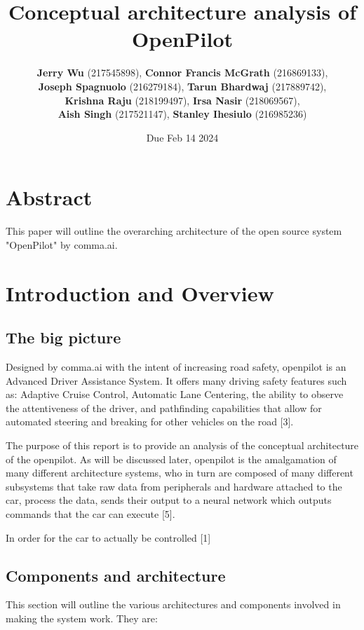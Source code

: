 \documentclass[12pt]{article}
\title{Conceptual architecture analysis of OpenPilot}
\author{
    \textbf{Jerry Wu} (217545898), \textbf{Connor Francis McGrath} (216869133),\\
    \textbf{Joseph Spagnuolo} (216279184), \textbf{Tarun Bhardwaj} (217889742),\\
    \textbf{Krishna Raju} (218199497), \textbf{Irsa Nasir} (218069567),\\
    \textbf{Aish Singh} (217521147), \textbf{Stanley Ihesiulo} (216985236)
}
\date{Due Feb 14 2024}
\begin{document}
\maketitle
\tableofcontents


\newpage


\section{Abstract}
This paper will outline the overarching architecture of the open source system "OpenPilot" by comma.ai.

\section{Introduction and Overview}

\subsection{The big picture}
Designed by comma.ai with the intent of increasing road safety, openpilot is an Advanced Driver Assistance System. It offers many driving safety features such as: Adaptive Cruise Control, Automatic Lane Centering, the ability to observe the attentiveness of the driver, and pathfinding capabilities that allow for automated steering and breaking for other vehicles on the road [3].

The purpose of this report is to provide an analysis of the conceptual architecture of the openpilot. As will be discussed later, openpilot is the amalgamation of many different architecture systems, who in turn are composed of many different subsystems that take raw data from peripherals and hardware attached to the car, process the data, sends their output to a neural network which outputs commands that the car can execute [5].

In order for the car to actually be controlled [1]


\subsection{Components and architecture}
This section will outline the various architectures and components involved in making the system work. They are:
\end{document}
